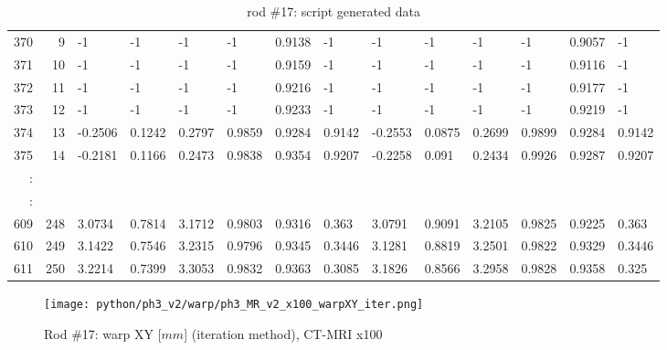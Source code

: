 \begin{table}[p]
{\begin{minipage}{\textheight}
\begin{tabular}{rr||lll|lll||lll|lll}
370     & 9    & -1      & -1      & -1            & -1     & 0.9138 & -1             & -1       & -1       & -1             & -1      & 0.9057  & -1              \\
371     & 10   & -1      & -1      & -1            & -1     & 0.9159 & -1             & -1       & -1       & -1             & -1      & 0.9116  & -1              \\
372     & 11   & -1      & -1      & -1            & -1     & 0.9216 & -1             & -1       & -1       & -1             & -1      & 0.9177  & -1              \\
373     & 12   & -1      & -1      & -1            & -1     & 0.9233 & -1             & -1       & -1       & -1             & -1      & 0.9219  & -1              \\
374     & 13   & -0.2506 & 0.1242  & 0.2797        & 0.9859 & 0.9284 & 0.9142         & -0.2553  & 0.0875   & 0.2699         & 0.9899  & 0.9284  & 0.9142          \\
375     & 14   & -0.2181 & 0.1166  & 0.2473        & 0.9838 & 0.9354 & 0.9207         & -0.2258  & 0.091    & 0.2434         & 0.9926  & 0.9287  & 0.9207          \\
:       &      &         &         &               &        &        &                &          &          &                &         &         &                 \\
\hline
:       &      &         &         &               &        &        &                &          &          &                &         &         &                 \\
609     & 248  & 3.0734  & 0.7814  & 3.1712        & 0.9803 & 0.9316 & 0.363          & 3.0791   & 0.9091   & 3.2105         & 0.9825  & 0.9225  & 0.363           \\
610     & 249  & 3.1422  & 0.7546  & 3.2315        & 0.9796 & 0.9345 & 0.3446         & 3.1281   & 0.8819   & 3.2501         & 0.9822  & 0.9329  & 0.3446          \\
611     & 250  & 3.2214  & 0.7399  & 3.3053        & 0.9832 & 0.9363 & 0.3085         & 3.1826   & 0.8566   & 3.2958         & 0.9828  & 0.9358  & 0.325          
\end{tabular}
       \caption{rod \#17: script generated data}
       \label{tab:spit-out-17}
     \end{minipage}
   }
 \end{table}

\begin{figure}[!bp]
  \centering
  \texttt{[image: python/ph3\_v2/warp/ph3\_MR\_v2\_x100\_warpXY\_iter.png]}
  \caption{Rod \#17: warp XY [$mm$] (iteration method), CT-MRI x100}
  \label{fig:ph3_warpXY_x100}
\end{figure}

